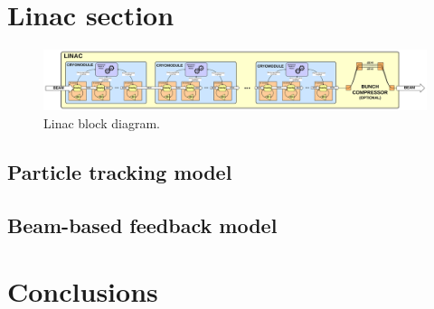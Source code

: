 \documentclass[a4paper,12pt]{article}
\begin{document}
% 
% 
% 
% 
% 
% 
% 

\newpage

\section{Linac section}

\begin{figure}
\centering
\includegraphics[scale=0.45]{../figures/Linac_block_diagram.png}
\caption{Linac block diagram.}
\label{fig:Linac_block_diagram}
\end{figure}

\subsection{Particle tracking model}

\subsection{Beam-based feedback model}

\section{Conclusions}

\newpage
\end{document}
